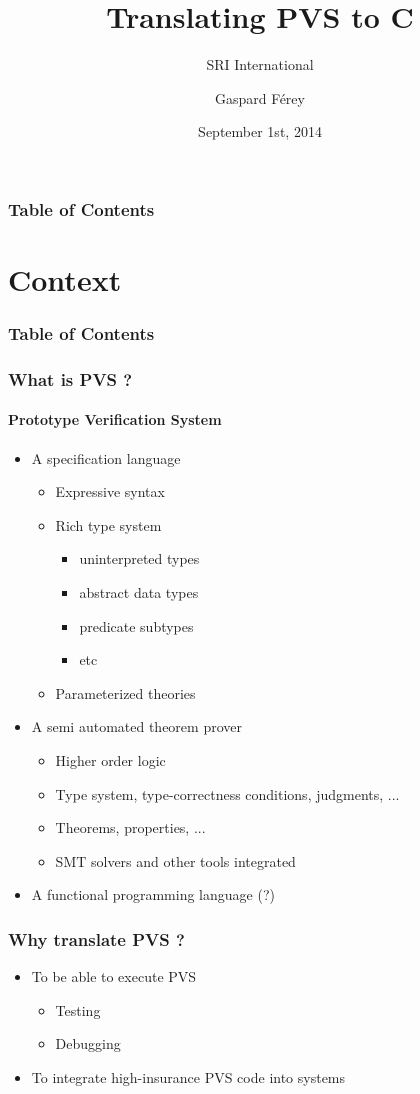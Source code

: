 \documentclass{beamer}
\title[From PVS to C]{Translating PVS to C}
\subtitle{SRI International}
\author[Gaspard Férey]{Gaspard Férey}
\institute{Ecole Polytechnique}
\date{September 1st, 2014}
\begin{document}
\frame{\titlepage}

\begin{frame}
\frametitle{Table of Contents}
\tableofcontents
\end{frame}


\section{Context}

\begin{frame}
\frametitle{Table of Contents}
\tableofcontents[currentsection]
\end{frame}


\begin{frame}
\frametitle{What is PVS ?}
\framesubtitle{Prototype Verification System}
\begin{itemize}
\itemsep1em
\item A specification language
\begin{itemize}
\item Expressive syntax
\item Rich type system
\begin{itemize}
\item uninterpreted types
\item abstract data types
\item predicate subtypes
\item etc
\end{itemize}
\item Parameterized theories
\end{itemize}
\item A semi automated theorem prover
\begin{itemize}
\item Higher order logic
\item Type system, type-correctness conditions, judgments, ...
\item Theorems, properties, ...
\item SMT solvers and other tools integrated
\end{itemize}
\item A functional programming language (?)
\end{itemize}

\end{frame}


\begin{frame}
\frametitle{Why translate PVS ?}

\begin{itemize}
\itemsep2em
\item To be able to execute PVS
\begin{itemize}
\item Testing
\item Debugging
\end{itemize}
\item To integrate high-insurance PVS code into systems
\end{itemize}

\end{frame}
\end{document}
